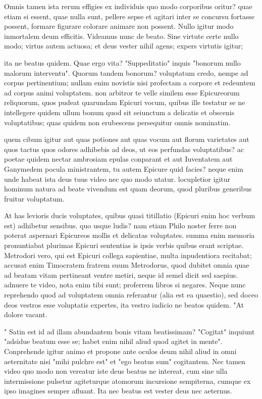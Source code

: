  Omnis tamen ista rerum effigies ex individuis quo modo corporibus oritur? quae etiam si essent, quae nulla sunt, pellere sepse et agitari inter se concursu fortasse possent, formare figurare colorare animare non possent. Nullo igitur modo inmortalem deum efficitis. Videamus nunc de beato. Sine virtute certe nullo modo; virtus autem actuosa; et deus vester nihil agens; expers virtutis igitur;

 ita ne beatus quidem. Quae ergo vita? "Suppeditatio" inquis "bonorum nullo malorum interventu". Quorum tandem bonorum? voluptatum credo, nempe ad corpus pertinentium; nullam enim novistis nisi profectam a corpore et redeuntem ad corpus animi voluptatem. non arbitror te velle similem esse Epicureorum reliquorum, quos pudeat quarundam Epicuri vocum, quibus ille testatur se ne intellegere quidem ullum bonum quod sit seiunctum a delicatis et obscenis voluptatibus; quas quidem non erubescens persequitur omnis nominatim.

 quem cibum igitur aut quas potiones aut quas vocum aut florum varietates aut quos tactus quos odores adhibebis ad deos, ut eos perfundas voluptatibus? ac poetae quidem nectar ambrosiam epulas conparant et aut Iuventatem aut Ganymedem pocula ministrantem, tu autem Epicure quid facies? neque enim unde habeat ista deus tuus video nec quo modo utatur. locupletior igitur hominum natura ad beate vivendum est quam deorum, quod pluribus generibus fruitur voluptatum.

 At has levioris ducis voluptates, quibus quasi titillatio (Epicuri enim hoc verbum est) adhibetur sensibus. quo usque ludis? nam etiam Philo noster ferre non poterat aspernari Epicureos mollis et delicatas voluptates. summa enim memoria pronuntiabat plurimas Epicuri sententias is ipsis verbis quibus erant scriptae. Metrodori vero, qui est Epicuri collega sapientiae, multa inpudentiora recitabat; accusat enim Timocratem fratrem suum Metrodorus, quod dubitet omnia quae ad beatam vitam pertineant ventre metiri, neque id semel dicit sed saepius. adnuere te video, nota enim tibi sunt; proferrem libros si negares. Neque nunc reprehendo quod ad voluptatem omnia referantur (alia est ea quaestio), sed doceo deos vestros esse voluptatis expertes, ita vestro iudicio ne beatos quidem. "At dolore vacant.

 " Satin est id ad illam abundantem bonis vitam beatissimam? "Cogitat" inquiunt "adsidue beatum esse se; habet enim nihil aliud quod agitet in mente". Conprehende igitur animo et propone ante oculos deum nihil aliud in omni aeternitate nisi "mihi pulchre est" et "ego beatus sum" cogitantem. Nec tamen video quo modo non vereatur iste deus beatus ne intereat, cum sine ulla intermissione pulsetur agiteturque atomorum incursione sempiterna, cumque ex ipso imagines semper afluant. Ita nec beatus est vester deus nec aeternus.

